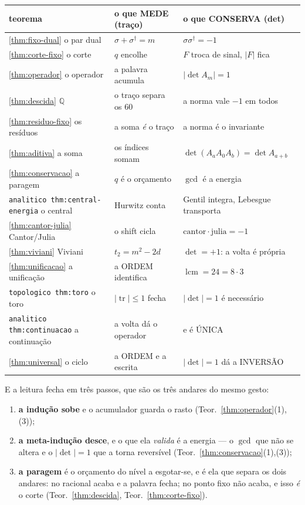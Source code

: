 \documentclass[11pt,a4paper]{article}
\newcommand{\code}[1]{\texttt{\small #1}}
\newcommand{\abs}[1]{\lvert #1\rvert}
\newcommand{\dg}{^{\dagger}}
\begin{document}
\begin{center}\small
\begin{tabular}{@{}lll@{}}
\toprule
\textbf{teorema} & \textbf{o que MEDE (traço)} & \textbf{o que CONSERVA (det)}\\
\midrule
\ref{thm:fixo-dual} o par dual & $\sigma+\sigma\dg=m$ & $\sigma\sigma\dg=-1$\\
\ref{thm:corte-fixo} o corte & $q$ encolhe & $F$ troca de sinal, $\abs{F}$ fica\\
\ref{thm:operador} o operador & a palavra acumula & $\abs{\det A_m}=1$\\
\ref{thm:descida} $\mathbb{Q}$ & o traço separa os $60$ & a norma vale $-1$ em todos\\
\ref{thm:residuo-fixo} os resíduos & a soma \emph{é} o traço & a norma é o invariante\\
\ref{thm:aditiva} a soma & os índices somam & $\det(A_aA_0A_b)=\det A_{a+b}$\\
\ref{thm:conservacao} a paragem & $q$ é o orçamento & $\gcd$ é a energia\\
\code{analitico thm:central-energia} o central & Hurwitz conta & Gentil integra, Lebesgue transporta\\
\ref{thm:cantor-julia} Cantor/Julia & o shift cicla & $\mathrm{cantor}\cdot\mathrm{julia}=-1$\\
\ref{thm:viviani} Viviani & $t_2=m^{2}-2d$ & $\det=+1$: a volta é própria\\
\ref{thm:unificacao} a unificação & a ORDEM identifica & $\operatorname{lcm}=24=8\cdot3$\\
\code{topologico thm:toro} o toro & $\abs{\operatorname{tr}}\le1$ fecha & $\abs{\det}=1$ é necessário\\
\code{analitico thm:continuacao} a continuação & a volta dá o operador & e é ÚNICA\\
\ref{thm:universal} o ciclo & a ORDEM e a escrita & $\abs{\det}=1$ dá a INVERSÃO\\
\bottomrule
\end{tabular}
\end{center}

\noindent E a leitura fecha em três passos, que são os três andares do mesmo gesto:
\begin{enumerate}
\item \textbf{a indução sobe} e o acumulador guarda o rasto (Teor.~\ref{thm:operador}(1),(3));
\item \textbf{a meta-indução desce}, e o que ela \emph{valida} é a energia --- o
$\gcd$ que não se altera e o $\abs{\det}=1$ que a torna reversível
(Teor.~\ref{thm:conservacao}(1),(3));
\item \textbf{a paragem} é o orçamento do nível a esgotar-se, e é ela que separa os dois
andares: no racional acaba e a palavra fecha; no ponto fixo não acaba, e isso \emph{é} o
corte (Teor.~\ref{thm:descida}, Teor.~\ref{thm:corte-fixo}).
\end{enumerate}
\end{document}
